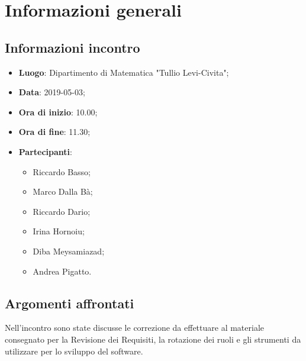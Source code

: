 \section{Informazioni generali}

\subsection{Informazioni incontro}
\begin{itemize}
	\item \textbf{Luogo}: Dipartimento di Matematica "Tullio Levi-Civita";
	\item \textbf{Data}: 2019-05-03;
	\item \textbf{Ora di inizio}: 10.00;
	\item \textbf{Ora di fine}: 11.30;
	\item \textbf{Partecipanti}: 
	\begin{itemize}
		\item Riccardo Basso;
		\item Marco Dalla Bà;
		\item Riccardo Dario;
		\item Irina Hornoiu;
		\item Diba Meysamiazad;
		\item Andrea Pigatto.	
	\end{itemize}
\end{itemize}

\subsection{Argomenti affrontati}
Nell'incontro sono state discusse le correzione da effettuare al materiale consegnato per la Revisione dei Requisiti, la rotazione dei ruoli e gli strumenti da utilizzare per lo sviluppo del software.

